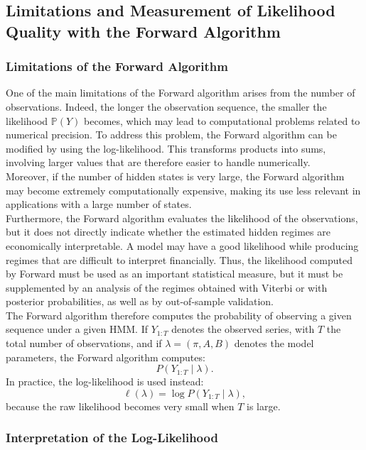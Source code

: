 \documentclass[11pt]{article}
\begin{document}
\subsection{Limitations and Measurement of Likelihood Quality with the Forward Algorithm}

\subsubsection{Limitations of the Forward Algorithm}
One of the main limitations of the Forward algorithm arises from the number of observations. Indeed, the longer the observation sequence, the smaller the likelihood $\mathbb{P}(Y)$ becomes, which may lead to computational problems related to numerical precision.
To address this problem, the Forward algorithm can be modified by using the log-likelihood. This transforms products into sums, involving larger values that are therefore easier to handle numerically.\\
Moreover, if the number of hidden states is very large, the Forward algorithm may become extremely computationally expensive, making its use less relevant in applications with a large number of states.\\

Furthermore, the Forward algorithm evaluates the likelihood of the observations, but it does not directly indicate whether the estimated hidden regimes are economically interpretable. A model may have a good likelihood while producing regimes that are difficult to interpret financially.
Thus, the likelihood computed by Forward must be used as an important statistical measure, but it must be supplemented by an analysis of the regimes obtained with Viterbi or with posterior probabilities, as well as by out-of-sample validation.\\

The Forward algorithm therefore computes the probability of observing a given sequence under a given HMM. If \(Y_{1:T}\) denotes the observed series, with \(T\) the total number of observations, and if \(\lambda=(\pi,A,B)\) denotes the model parameters, the Forward algorithm computes:
\[
P(Y_{1:T}\mid \lambda).
\]
In practice, the log-likelihood is used instead:
\[
\ell(\lambda)=\log P(Y_{1:T}\mid \lambda),
\]
because the raw likelihood becomes very small when \(T\) is large.

\subsubsection{Interpretation of the Log-Likelihood}
\end{document}

